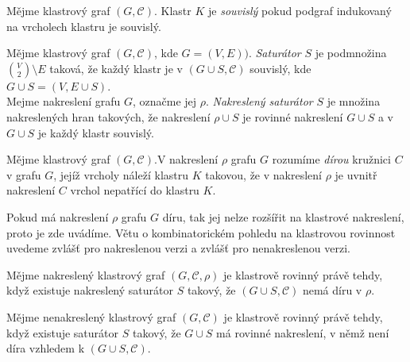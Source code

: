 \begin{defn}
Mějme klastrový graf $(G,\mathcal C)$. Klastr $K$ je \textit{souvislý} pokud podgraf indukovaný na vrcholech klastru je souvislý. 
\end{defn}

\begin{defn}
Mějme klastrový graf $(G,\mathcal C)$, kde $G=(V,E))$. \textit{Saturátor} $S$ je podmnožina ${V \choose 2} \setminus E$ taková, že každý klastr je v $(G \cup S,\mathcal C)$ souvislý, kde $G \cup S = (V,E \cup S)$. \\
Mejme nakreslení grafu $G$, označme jej $\rho$. \textit{Nakreslený saturátor} $S$ je množina nakreslených hran takových, že nakreslení $\rho \cup S$ je rovinné nakreslení $G \cup S$ a v $G \cup S$ je každý klastr souvislý. 
\end{defn}

\begin{defn}
Mějme klastrový graf $(G,\mathcal C)$.V nakreslení $\rho$ grafu $G$ rozumíme \textit{dírou} kružnici $C$ v grafu $G$, jejíž vrcholy náleží klastru $K$ takovou, že v nakreslení $\rho$  je uvnitř nakreslení $C$ vrchol nepatřící do klastru $K$.
\end{defn}

Pokud má nakreslení $\rho$ grafu $G$ díru, tak jej nelze rozšířit na klastrové nakreslení, proto je zde uvádíme.
Větu o kombinatorickém pohledu na klastrovou rovinnost uvedeme zvlášť pro nakreslenou verzi a zvlášť pro nenakreslenou verzi.

\begin{theorem}Mějme nakreslený klastrový graf $(G,\mathcal C, \rho)$ je klastrově rovinný právě tehdy, když existuje nakreslený saturátor $S$ takový, že $(G \cup S,\mathcal C)$ nemá díru v $\rho$.
\end{theorem}

\begin{theorem}Mějme nenakreslený klastrový graf $(G,\mathcal C)$ je klastrově rovinný právě tehdy, když existuje saturátor $S$ takový, že $G \cup S$ má rovinné nakreslení, v němž není díra vzhledem k $(G \cup S,\mathcal C)$.
\end{theorem}
